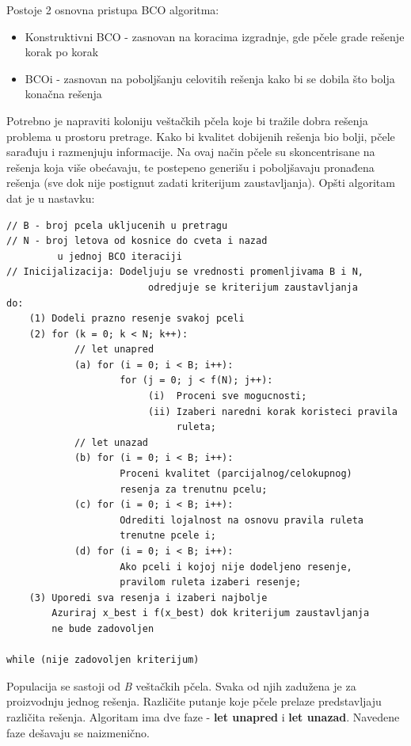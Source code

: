 \documentclass[a4paper]{article}
\begin{document}
{Postoje 2 osnovna pristupa BCO algoritma:
\begin{itemize}%
\setlength{\labelsep}{10pt}
	\item Konstruktivni BCO - zasnovan na koracima izgradnje, gde pčele grade rešenje korak po korak
	\item BCOi - zasnovan na poboljšanju celovitih rešenja kako bi se dobila što bolja konačna rešenja \cite{bcoalg}
\end{itemize}

Potrebno je napraviti koloniju veštačkih pčela koje bi tražile dobra rešenja problema u prostoru pretrage. Kako bi kvalitet dobijenih rešenja bio bolji, pčele sarađuju i razmenjuju informacije. Na ovaj način pčele su skoncentrisane na rešenja koja više obećavaju, te postepeno generišu i poboljšavaju pronađena rešenja (sve dok nije postignut zadati kriterijum zaustavljanja).
Opšti algoritam dat je u nastavku:

\begin{lstlisting}[caption={Pseudokod {\em BCO} algoritma \cite{algoritam} },frame=single, label=simple]
// B - broj pcela ukljucenih u pretragu
// N - broj letova od kosnice do cveta i nazad 
	     u jednoj BCO iteraciji
// Inicijalizacija: Dodeljuju se vrednosti promenljivama B i N, 
		 		         odredjuje se kriterijum zaustavljanja
do:
    (1) Dodeli prazno resenje svakoj pceli
    (2) for (k = 0; k < N; k++):
    		// let unapred
    		(a) for (i = 0; i < B; i++):
    			    for (j = 0; j < f(N); j++):
    					 (i)  Proceni sve mogucnosti;
    					 (ii) Izaberi naredni korak koristeci pravila 
    					      ruleta;
    		// let unazad
    		(b) for (i = 0; i < B; i++):
    			    Proceni kvalitet (parcijalnog/celokupnog) 
    			    resenja	za trenutnu pcelu;
    		(c) for (i = 0; i < B; i++):  
    		    	Odrediti lojalnost na osnovu pravila ruleta
    		    	trenutne pcele i;
		    (d) for (i = 0; i < B; i++):
		       		Ako pceli i kojoj nije dodeljeno resenje, 
		       		pravilom ruleta izaberi resenje;
    (3) Uporedi sva resenja i izaberi najbolje
        Azuriraj x_best i f(x_best) dok kriterijum zaustavljanja
        ne bude zadovoljen
    
while (nije zadovoljen kriterijum)
\end{lstlisting}

Populacija se sastoji od {\em B} veštačkih pčela. Svaka od njih zadužena je za proizvodnju jednog rešenja. Različite putanje koje pčele prelaze predstavljaju različita rešenja. Algoritam ima dve faze - \textbf{let unapred} i \textbf{let unazad}. Navedene faze dešavaju se naizmenično\cite{algoritam}.

}
\end{document}
